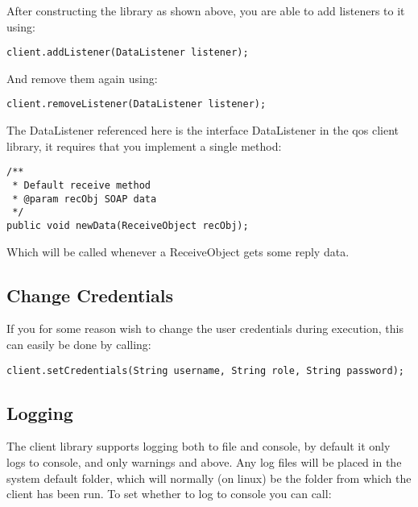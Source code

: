     After constructing the library as shown above, you are able to add listeners to it using:
    
\begin{lstlisting}[caption={Add listener}, label=userguideAddlistener]
    client.addListener(DataListener listener);
\end{lstlisting}

    And remove them again using:
    
\begin{lstlisting}[caption={Remove listener}, label=userguideRemovelistener]
    client.removeListener(DataListener listener);
\end{lstlisting}

    The DataListener referenced here is the interface DataListener in the qos client library, it requires that you implement a single method:

\begin{lstlisting}[caption={The DataListener interface}, label=userguideDatalistener]
/**
 * Default receive method
 * @param recObj SOAP data
 */
public void newData(ReceiveObject recObj);
\end{lstlisting}

    Which will be called whenever a ReceiveObject gets some reply data.

\subsection{Change Credentials}\label{Change Credentials}
    
    If you for some reason wish to change the user credentials during execution, this can easily be done by calling:
    
\begin{lstlisting}[caption={Changing user credentials}, label=userguideCredentials]
    client.setCredentials(String username, String role, String password);
\end{lstlisting}

\subsection{Logging}\label{userguideLogging}

    The client library supports logging both to file and console, by default it only logs to console, and only warnings and above. Any log files will be placed in the system default folder, which will normally (on linux) be the folder from which the client has been run. To set whether to log to console you can call:

